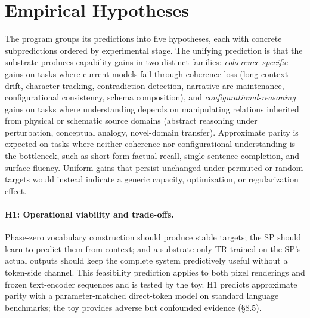 \documentclass[11pt,a4paper]{article}
\begin{document}
\section{Empirical Hypotheses}

The program groups its predictions into five hypotheses, each with concrete subpredictions ordered by experimental stage. The unifying prediction is that the substrate produces capability gains in two distinct families: \emph{coherence-specific} gains on tasks where current models fail through coherence loss (long-context drift, character tracking, contradiction detection, narrative-arc maintenance, configurational consistency, schema composition), and \emph{configurational-reasoning} gains on tasks where understanding depends on manipulating relations inherited from physical or schematic source domains (abstract reasoning under perturbation, conceptual analogy, novel-domain transfer). Approximate parity is expected on tasks where neither coherence nor configurational understanding is the bottleneck, such as short-form factual recall, single-sentence completion, and surface fluency. Uniform gains that persist unchanged under permuted or random targets would instead indicate a generic capacity, optimization, or regularization effect.

\paragraph{H1: Operational viability and trade-offs.} Phase-zero vocabulary construction should produce stable targets; the SP should learn to predict them from context; and a substrate-only TR trained on the SP's actual outputs should keep the complete system predictively useful without a token-side channel. This feasibility prediction applies to both pixel renderings and frozen text-encoder sequences and is tested by the toy. H1 predicts approximate parity with a parameter-matched direct-token model on standard language benchmarks; the toy provides adverse but confounded evidence (§8.5).
\end{document}
